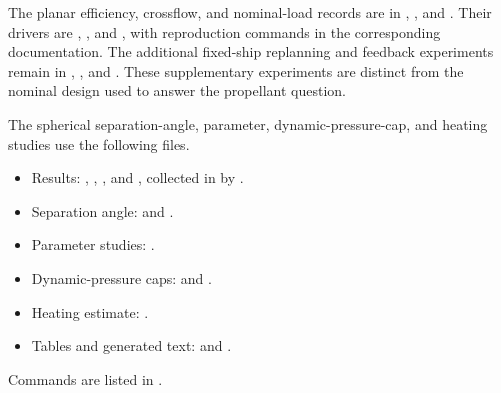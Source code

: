 \documentclass[12pt,a4paper]{article}
\begin{document}
The planar efficiency, crossflow, and nominal-load records are in , , and . Their drivers are , , and , with reproduction commands in the corresponding documentation. The additional fixed-ship replanning and feedback experiments remain in , , and . These supplementary experiments are distinct from the nominal design used to answer the propellant question.

The spherical separation-angle, parameter, dynamic-pressure-cap, and heating studies use the following files.
\begin{itemize}
\item Results: , , , and , collected in  by .
\item Separation angle:  and .
\item Parameter studies: .
\item Dynamic-pressure caps:  and .
\item Heating estimate: .
\item Tables and generated text:  and .
\end{itemize}
Commands are listed in .
\endgroup

\clearpage

\end{document}
